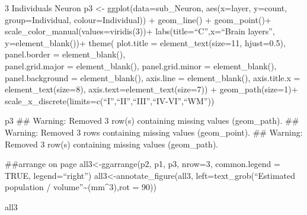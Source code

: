 \documentclass[
]{article}
\begin{document}
3 Individuals Neuron p3 \textless- ggplot(data=sub\_Neuron, aes(x=layer,
y=count, group=Individual, colour=Individual)) + geom\_line() +
geom\_point()+ scale\_color\_manual(values=viridis(3))+
labs(title=``C'',x=``Brain layers'', y=element\_blank())+ theme(
plot.title = element\_text(size=11, hjust=0.5), panel.border =
element\_blank(),\\
panel.grid.major = element\_blank(), panel.grid.minor =
element\_blank(), panel.background = element\_blank(), axis.line =
element\_blank(), axis.title.x = element\_text(size=8),
axis.text=element\_text(size=7)) + geom\_path(size=1)+
scale\_x\_discrete(limits=c(``I'',``II'',``III'',``IV-VI'',``WM''))

p3 \#\# Warning: Removed 3 row(s) containing missing values
(geom\_path). \#\# Warning: Removed 3 rows containing missing values
(geom\_point). \#\# Warning: Removed 3 row(s) containing missing values
(geom\_path).

\#\#arrange on page all3\textless-ggarrange(p2, p1, p3, nrow=3,
common.legend = TRUE, legend=``right'')
all3\textless-annotate\_figure(all3, left=text\_grob(``Estimated
population / volume''\textasciitilde(mm\^{}3),rot = 90))

all3
\end{document}
